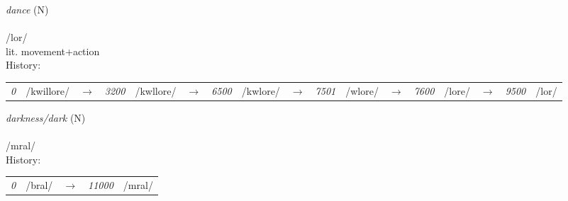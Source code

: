 \vspace{15pt}
\begin{nopagebreak}
 \textit{dance} (N)\\
\\
\noindent /l{\textprimstress}or/\\
\noindent lit. movement+action\\


\noindent History:

\vspace{-0pt}
\hspace{40pt}
\begin{tabular}{ccc}
\textit{0} & /kwillore/&$\rightarrow$ & \textit{3200} & /kwllore/&$\rightarrow$ & \textit{6500} & /kwlore/&$\rightarrow$ & \textit{7501} & /wlore/&$\rightarrow$ & \textit{7600} & /lore/&$\rightarrow$ & \textit{9500} & /lor/& \\
\end{tabular}

\vspace{20pt}\hline

\end{nopagebreak}
\filbreak



\vspace{15pt}
\begin{nopagebreak}
 \textit{darkness/dark} (N)\\
\\
\noindent /mr{\textprimstress}al/\\


\noindent History:

\vspace{-0pt}
\hspace{40pt}
\begin{tabular}{ccc}
\textit{0} & /bral/&$\rightarrow$ & \textit{11000} & /mral/& \\
\end{tabular}

\vspace{20pt}\hline

\end{nopagebreak}
\filbreak



